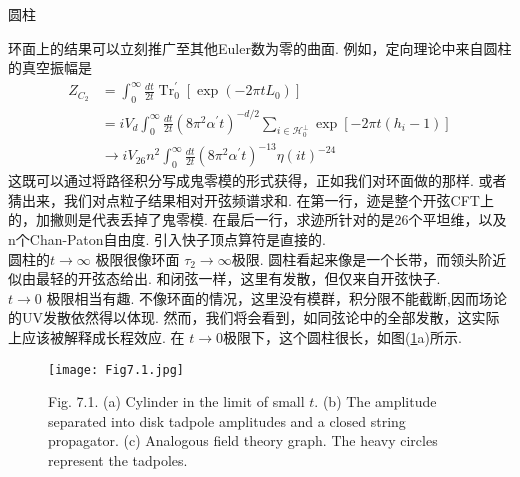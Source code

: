 \centerline{\Large 圆柱}
环面上的结果可以立刻推广至其他Euler数为零的曲面. 例如，定向理论中来自圆柱的真空振幅是
\begin{equation}
	\begin{aligned}
		Z_{C_{2}} &=\int_{0}^{\infty} \frac{d t}{2 t} \operatorname{Tr}_{0}^{\prime}\left[\exp \left(-2 \pi t L_{0}\right)\right] \\
		&=i V_{d} \int_{0}^{\infty} \frac{d t}{2 t}\left(8 \pi^{2} \alpha^{\prime} t\right)^{-d / 2} \sum_{i \in \mathscr{H}_{0}^{\perp}} \exp \left[-2 \pi t\left(h_{i}-1\right)\right] \\
		& \rightarrow i V_{26} n^{2} \int_{0}^{\infty} \frac{d t}{2 t}\left(8 \pi^{2} \alpha^{\prime} t\right)^{-13} \eta(i t)^{-24}
	\end{aligned}
\end{equation}
这既可以通过将路径积分写成鬼零模的形式获得，正如我们对环面做的那样. 或者猜出来，我们对点粒子结果相对开弦频谱求和. 在第一行，迹是整个开弦CFT上的，加撇则是代表丢掉了鬼零模. 在最后一行，求迹所针对的是26个平坦维，以及n个Chan-Paton自由度. 引入快子顶点算符是直接的. \\
圆柱的$t \rightarrow \infty$ 极限很像环面 $\tau_{2} \rightarrow \infty$极限. 圆柱看起来像是一个长带，而领头阶近似由最轻的开弦态给出. 和闭弦一样，这里有发散，但仅来自开弦快子.\\
$t \rightarrow 0$ 极限相当有趣. 不像环面的情况，这里没有模群，积分限不能截断,因而场论的UV发散依然得以体现. 然而，我们将会看到，如同弦论中的全部发散，这实际上应该被解释成长程效应. 在 $t \rightarrow 0$极限下，这个圆柱很长，如图(\ref{Fig7.1}a)所示. 
\begin{figure}
	\begin{center}
		\texttt{[image: Fig7.1.jpg]}\\
		\caption{Fig. 7.1. (a) Cylinder in the limit of small $t$. (b) The amplitude separated into disk tadpole amplitudes and a closed string propagator. (c) Analogous field theory graph. The heavy circles represent the tadpoles.}\label{Fig7.1}
	\end{center}
\end{figure}

